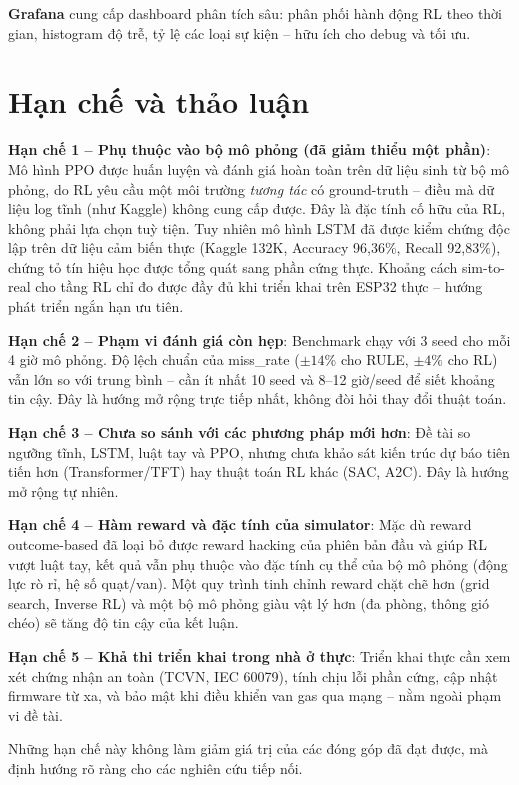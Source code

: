 \textbf{Grafana} cung cấp dashboard phân tích sâu: phân phối hành động RL theo thời gian, histogram độ trễ, tỷ lệ các loại sự kiện -- hữu ích cho debug và tối ưu.

\section{Hạn chế và thảo luận}

\textbf{Hạn chế 1 -- Phụ thuộc vào bộ mô phỏng (đã giảm thiểu một phần)}: Mô hình PPO được huấn luyện và đánh giá hoàn toàn trên dữ liệu sinh từ bộ mô phỏng, do RL yêu cầu một môi trường \emph{tương tác} có ground-truth -- điều mà dữ liệu log tĩnh (như Kaggle) không cung cấp được. Đây là đặc tính cố hữu của RL, không phải lựa chọn tuỳ tiện. Tuy nhiên mô hình LSTM đã được kiểm chứng độc lập trên dữ liệu cảm biến thực (Kaggle 132K, Accuracy 96{,}36\%, Recall 92{,}83\%), chứng tỏ tín hiệu học được tổng quát sang phần cứng thực. Khoảng cách sim-to-real cho tầng RL chỉ đo được đầy đủ khi triển khai trên ESP32 thực -- hướng phát triển ngắn hạn ưu tiên.

\textbf{Hạn chế 2 -- Phạm vi đánh giá còn hẹp}: Benchmark chạy với 3 seed cho mỗi 4 giờ mô phỏng. Độ lệch chuẩn của miss\_rate ($\pm 14\%$ cho RULE, $\pm 4\%$ cho RL) vẫn lớn so với trung bình -- cần ít nhất 10 seed và 8--12 giờ/seed để siết khoảng tin cậy. Đây là hướng mở rộng trực tiếp nhất, không đòi hỏi thay đổi thuật toán.

\textbf{Hạn chế 3 -- Chưa so sánh với các phương pháp mới hơn}: Đề tài so ngưỡng tĩnh, LSTM, luật tay và PPO, nhưng chưa khảo sát kiến trúc dự báo tiên tiến hơn (Transformer/TFT) hay thuật toán RL khác (SAC, A2C). Đây là hướng mở rộng tự nhiên.

\textbf{Hạn chế 4 -- Hàm reward và đặc tính của simulator}: Mặc dù reward outcome-based đã loại bỏ được reward hacking của phiên bản đầu và giúp RL vượt luật tay, kết quả vẫn phụ thuộc vào đặc tính cụ thể của bộ mô phỏng (động lực rò rỉ, hệ số quạt/van). Một quy trình tinh chỉnh reward chặt chẽ hơn (grid search, Inverse RL) và một bộ mô phỏng giàu vật lý hơn (đa phòng, thông gió chéo) sẽ tăng độ tin cậy của kết luận.

\textbf{Hạn chế 5 -- Khả thi triển khai trong nhà ở thực}: Triển khai thực cần xem xét chứng nhận an toàn (TCVN, IEC 60079), tính chịu lỗi phần cứng, cập nhật firmware từ xa, và bảo mật khi điều khiển van gas qua mạng -- nằm ngoài phạm vi đề tài.

Những hạn chế này không làm giảm giá trị của các đóng góp đã đạt được, mà định hướng rõ ràng cho các nghiên cứu tiếp nối.
